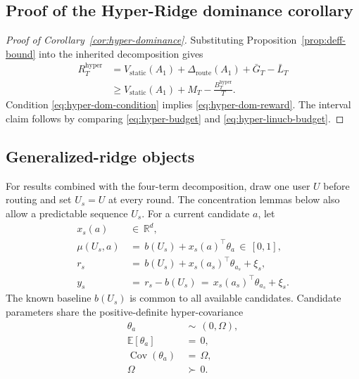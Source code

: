 \documentclass{article} %
\begin{document}
\subsection{Proof of the Hyper-Ridge dominance corollary}
\label{app:proof-hyper-dominance}

\begin{proof}[Proof of Corollary~\ref{cor:hyper-dominance}]
Substituting Proposition~\ref{prop:deff-bound} into the inherited decomposition gives
\begin{equation}
\label{eq:hyper-cor-proof}
\begin{aligned}
R_T^{\mathrm{hyper}}
&=
V_{\mathrm{static}}(A_1)
+
\Delta_{\mathrm{route}}(A_1)
+
\bar G_T
-
\bar L_T
\\
&\ge
V_{\mathrm{static}}(A_1)
+
M_T
-
\frac{B_T^{\mathrm{hyper}}}{T}.
\end{aligned}
\end{equation}
Condition \eqref{eq:hyper-dom-condition} implies \eqref{eq:hyper-dom-reward}. The interval claim follows by comparing \eqref{eq:hyper-budget} and \eqref{eq:hyper-linucb-budget}.
\end{proof}

\subsection{Generalized-ridge objects}

For results combined with the four-term decomposition, draw one user \(U\)
before routing and set \(U_s=U\) at every round. The concentration lemmas below
also allow a predictable sequence \(U_s\). For a current candidate \(a\), let
\begin{align}
x_s(a)
&\,\in\,
\mathbb R^d,
\label{eq:hyper-feature}
\\
\mu(U_s,a)
&\,=\,
b(U_s)+x_s(a)^\top\theta_a
\,\in\,
[0,1],
\label{eq:hyper-linear-model-app}
\\
r_s
&\,=\,
b(U_s)+x_s(a_s)^\top\theta_{a_s}+\xi_s,
\label{eq:hyper-reward}
\\
y_s
&\,=\,
r_s-b(U_s)
\,=\,
x_s(a_s)^\top\theta_{a_s}+\xi_s.
\label{eq:hyper-centered-reward}
\end{align}
The known baseline \(b(U_s)\) is common to all available candidates.
Candidate parameters share the positive-definite hyper-covariance
\begin{align}
\theta_a
&\,\sim\,
(0,\Omega),
\label{eq:hyper-random-effects}
\\
\mathbb E[\theta_a]
&\,=\,
0,
\label{eq:hyper-random-effects-mean}
\\
\operatorname{Cov}(\theta_a)
&\,=\,
\Omega,
\label{eq:hyper-random-effects-cov}
\\
\Omega
&\,\succ\,
0.
\label{eq:hyper-omega-pd}
\end{align}
\end{document}
